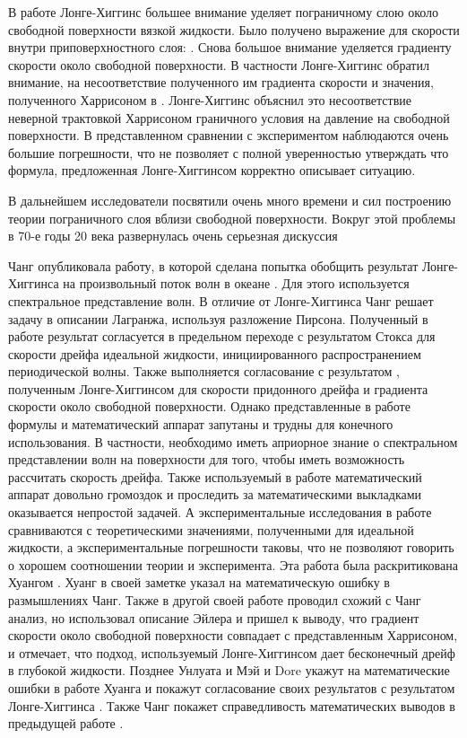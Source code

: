 В работе \cite{longuet1960mass} Лонге-Хиггинс большее внимание уделяет пограничному слою около свободной поверхности вязкой жидкости. Было получено выражение для скорости внутри приповерхностного слоя:
.
Снова большое внимание уделяется градиенту скорости около свободной поверхности. В частности Лонге-Хиггинс обратил внимание, на несоответствие полученного им градиента скорости и значения, полученного Харрисоном в \cite{harrison1909influence}. Лонге-Хиггинс объяснил это несоответствие неверной трактовкой Харрисоном граничного условия на давление на свободной поверхности. В представленном сравнении с экспериментом наблюдаются очень большие погрешности, что не позволяет с полной уверенностью утверждать что формула, предложенная Лонге-Хиггинсом корректно описывает ситуацию.

В дальнейшем исследователи посвятили очень много времени и сил построению теории пограничного слоя вблизи свободной поверхности. Вокруг этой проблемы в 70-е годы 20 века развернулась очень серьезная дискуссия

Чанг опубликовала работу, в которой сделана попытка обобщить результат Лонге-Хиггинса на произвольный поток волн в океане \cite{chang1969mass}. Для этого используется спектральное представление волн. В отличие от Лонге-Хиггинса Чанг решает задачу в описании Лагранжа, используя разложение Пирсона. Полученный в работе результат согласуется в предельном переходе с результатом Стокса для скорости дрейфа идеальной жидкости, инициированного распространением периодической волны. Также выполняется согласование с результатом , полученным Лонге-Хиггинсом для скорости придонного дрейфа и градиента скорости около свободной поверхности. Однако представленные в работе формулы и математический аппарат запутаны и трудны для конечного использования. В частности, необходимо иметь априорное знание о спектральном представлении волн на поверхности для того, чтобы иметь возможность рассчитать скорость дрейфа. Также используемый в работе математический аппарат довольно громоздок и проследить за математическими выкладками оказывается непростой задачей. А экспериментальные исследования в работе сравниваются с теоретическими значениями, полученными для идеальной жидкости, а экспериментальные погрешности таковы, что не позволяют говорить о хорошем соотношении теории и эксперимента. Эта работа была раскритикована Хуангом \cite{huang1970discussion}. Хуанг в своей заметке указал на математическую ошибку в размышлениях Чанг. Также в другой своей работе \cite{huang1970mass} проводил схожий с Чанг анализ, но использовал описание Эйлера и пришел к выводу, что градиент скорости около свободной поверхности совпадает с представленным Харрисоном, и отмечает, что подход, используемый Лонге-Хиггинсом дает бесконечный дрейф в глубокой жидкости. Позднее Унлуата и Мэй \cite{unluata1970mass} и Dore \cite{dore1973mass} укажут на математические ошибки в работе Хуанга \cite{huang1970mass} и покажут согласование своих результатов с результатом Лонге-Хиггинса \cite{longuet1953mass}. Также Чанг \cite{chang1970reply} покажет справедливость математических выводов  в предыдущей работе \cite{chang1969mass}.

